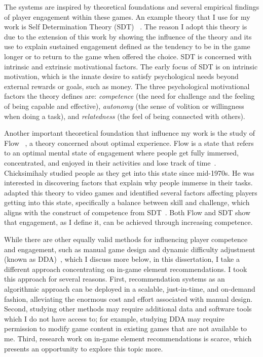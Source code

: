 The systems are inspired by theoretical foundations and several empirical findings of player engagement within these games. An example theory that I use for my work is Self Determination Theory (SDT) ~\cite{ryan2006motivational,przybylski2010motivational,yee2006motivations,wu2010falling,sherry2006video,lazzaro2004we,schoenau2011player}. The reason I adopt this theory is due to the extension of this work by \cite{przybylski2010motivational,ryan2006motivational} showing the influence of the theory and its use to explain sustained engagement defined as the tendency to be in the game longer or to return to the game when offered the choice. SDT is concerned with intrinsic and extrinsic motivational factors. The early focus of SDT is on intrinsic motivation, which is the innate desire to satisfy psychological needs beyond external rewards or goals, such as money. The three psychological motivational factors the theory defines are: \textit{competence} (the need for challenge and the feeling of being capable and effective), \textit{autonomy} (the sense of volition or willingness when doing a task), and \textit{relatedness} (the feel of being connected with others). 

Another important theoretical foundation that influence my work is the study of Flow ~\cite{flow1990psychology}, a theory concerned about optimal experience. Flow is a state that refers to an optimal mental state of engagement where people get fully immersed, concentrated, and enjoyed in their activities and lose track of time~\cite{flow1990psychology}. Chicksimihaly studied people as they get into this state since mid-1970s. He was interested in discovering factors that explain why people immerse in their tasks. \cite{sweetser2005gameflow,chen2007flow} adapted this theory to video games and identified several factors affecting players getting into this state, specifically a balance between skill and challenge, which aligns with the construct of competence from SDT~\cite{ryan2000self}. Both Flow and SDT show that engagement, as I define it, can be achieved through increasing competence. 

While there are other equally valid methods for influencing player competence and engagement, such as manual game design and dynamic difficulty adjustment (known as DDA)~\cite{hunicke2005case}, which I discuss more below, in this dissertation, I take a different approach concentrating on in-game element recommendations. I took this approach for several reasons. First, recommendation systems as an algorithmic approach can be deployed in a scalable, just-in-time, and on-demand fashion, alleviating the enormous cost and effort associated with manual design. Second, studying other methods may require additional data and software tools which I do not have access to; for example, studying DDA may require permission to modify game content in existing games that are not available to me. Third, research work on in-game element recommendations is scarce, which presents an opportunity to explore this topic more. 

